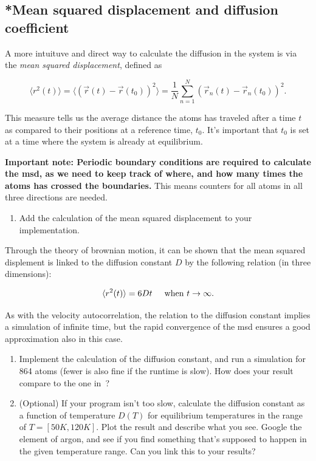 \documentclass[11pt,british,a4paper]{report}
\begin{document}
\subsection{*Mean squared displacement and diffusion coefficient}
A more intuituve and direct way to calculate the diffusion in the system is via the \textit{mean squared displacement}, defined as

\begin{equation}
 \langle r^2(t) \rangle = \langle (\vec{r}(t) - \vec{r}(t_0))^2 \rangle = \frac{1}{N} \sum_{n=1}^N (\vec{r}_n(t) - \vec{r}_n(t_0))^2.
 \label{eq:msd}
\end{equation}

This measure tells us the average distance the atoms has traveled after a time $t$ as compared to their positions at a reference time, $t_0$. It's important that $t_0$ is set at a time where the system is already at equilibrium.

\textbf{Important note: Periodic boundary conditions are required to calculate the msd, as we need to keep track of where, and how many times the atoms has crossed the boundaries.} This means counters for all atoms in all three directions are needed.

\begin{enumerate}[label=\roman*.]
    \item Add the calculation of the mean squared displacement to your implementation.
\end{enumerate}

Through the theory of brownian motion, it can be shown that the mean squared displement is linked to the diffusion constant $D$ by the following relation (in three dimensions):

\begin{equation}
 \langle r^2(t) \rangle = 6Dt \hspace{0.5 cm} \text{when } t \rightarrow \infty.
\end{equation}

As with the velocity autocorrelation, the relation to the diffusion constant implies a simulation of infinite time, but the rapid convergence of the msd ensures a good approximation also in this case.  

\begin{enumerate}[label=\roman*., resume]
    \item Implement the calculation of the diffusion constant, and run a simulation for 864 atoms (fewer is also fine if the runtime is slow). How does your result compare to the one in~\cite{Rahman_1964}?
    \item (Optional) If your program isn't too slow, calculate the diffusion constant as a function of temperature \(D(T)\) for equilibrium temperatures in the range of \(T = [50 K, 120K]\). Plot the result and describe what you see. Google the element of argon, and see if you find something that's supposed to happen in the given temperature range. Can you link this to your results?   
\end{enumerate}
\end{document}
